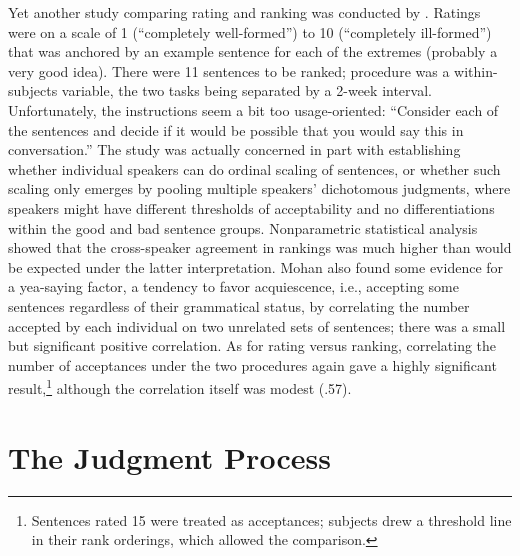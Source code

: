 Yet another study comparing rating and ranking was conducted by \citet{Mohan1977}. Ratings were on a scale of 1 (``completely well-formed'') to 10 (``completely ill-formed'') that was anchored by an example sentence for each of the extremes (probably a very good idea). There were 11 sentences to be ranked; procedure was a within-subjects variable, the two tasks being separated by a 2-week interval. Unfortunately, the instructions seem a bit too usage-oriented: ``Consider each of the sentences and decide if it would be possible that you would say this in conversation.'' The study was actually concerned in part with establishing whether individual speakers can do ordinal scaling of sentences, or whether such scaling only emerges by pooling multiple speakers' dichotomous judgments, where speakers might have different thresholds of acceptability and no differentiations within the good and bad sentence groups. Nonparametric statistical analysis showed that the cross-speaker agreement in rankings was much higher than would be expected under the latter interpretation. Mohan also found some evidence for a yea-saying factor, a tendency to favor acquiescence, i.e., accepting some sentences regardless of their grammatical status, by correlating the number accepted by each individual on two unrelated sets of sentences; there was a small but significant positive correlation. As for rating versus ranking, correlating the number of acceptances under the two procedures again gave a highly significant result,\footnote{Sentences rated 1\textendash{}5 were treated as acceptances; subjects drew a threshold line in their rank orderings, which allowed the comparison.}
 although the correlation itself was modest (.57).

\section{The Judgment Process}\label{sec:3.4}

